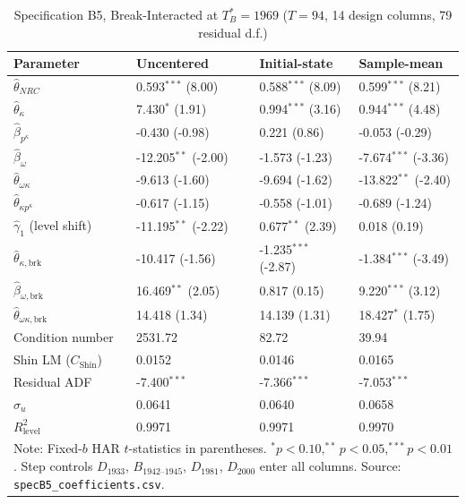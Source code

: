 \documentclass[11pt,a4paper]{article}
\begin{document}
\begin{table}[H]
\centering
\caption{Specification B5, Break-Interacted at $T_B^{*} = 1969$ ($T = 94$, 14 design columns, 79 residual d.f.)}
\label{tab:b5_inter}
\small
\begin{tabular}{p{5.2cm}p{2.9cm}p{2.9cm}p{2.9cm}}
\toprule
Parameter & Uncentered & Initial-state & Sample-mean \\
\midrule
$\hat{\theta}_{NRC}$ & 0.593$^{***}$ (8.00) & 0.588$^{***}$ (8.09) & 0.599$^{***}$ (8.21) \\
$\hat{\theta}_{\kappa}$ & 7.430$^{*}$ (1.91) & 0.994$^{***}$ (3.16) & 0.944$^{***}$ (4.48) \\
$\hat{\beta}_{p^{\kappa}}$ & -0.430 (-0.98) & 0.221 (0.86) & -0.053 (-0.29) \\
$\hat{\beta}_{\omega}$ & -12.205$^{**}$ (-2.00) & -1.573 (-1.23) & -7.674$^{***}$ (-3.36) \\
$\hat{\theta}_{\omega\kappa}$ & -9.613 (-1.60) & -9.694 (-1.62) & -13.822$^{**}$ (-2.40) \\
$\hat{\theta}_{\kappa p^{\kappa}}$ & -0.617 (-1.15) & -0.558 (-1.01) & -0.689 (-1.24) \\
$\hat{\gamma}_1$ (level shift) & -11.195$^{**}$ (-2.22) & 0.677$^{**}$ (2.39) & 0.018 (0.19) \\
$\hat{\theta}_{\kappa,\text{brk}}$ & -10.417 (-1.56) & -1.235$^{***}$ (-2.87) & -1.384$^{***}$ (-3.49) \\
$\hat{\beta}_{\omega,\text{brk}}$ & 16.469$^{**}$ (2.05) & 0.817 (0.15) & 9.220$^{***}$ (3.12) \\
$\hat{\theta}_{\omega\kappa,\text{brk}}$ & 14.418 (1.34) & 14.139 (1.31) & 18.427$^{*}$ (1.75) \\
\midrule
Condition number & 2531.72 & 82.72 & 39.94 \\
Shin LM ($C_{\text{Shin}}$) & 0.0152 & 0.0146 & 0.0165 \\
Residual ADF & -7.400$^{***}$ & -7.366$^{***}$ & -7.053$^{***}$ \\
$\hat{\sigma}_u$ & 0.0641 & 0.0640 & 0.0658 \\
$R^2_{\text{level}}$ & 0.9971 & 0.9971 & 0.9970 \\
\bottomrule
\multicolumn{4}{p{15.5cm}}{\footnotesize Note: Fixed-$b$ HAR $t$-statistics in parentheses. $^{*}p<0.10, ^{**}p<0.05, ^{***}p<0.01$. Step controls $D_{1933}$, $B_{1942\text{--}1945}$, $D_{1981}$, $D_{2000}$ enter all columns. Source: \texttt{specB5\_coefficients.csv}.}
\end{tabular}
\end{table}
\end{document}
